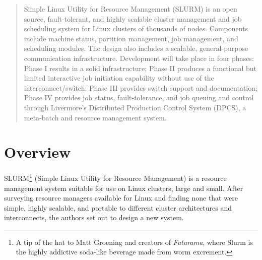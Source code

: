 
\newcommand{\srun}{{\tt srun}}
\newcommand{\scancel}{{\tt scancel}}
\newcommand{\squeue}{{\tt squeue}}
\newcommand{\scontrol}{{\tt scontrol}}
\newcommand{\slurmctld}{{\tt slurmctld}}
\newcommand{\slurmd}{{\tt slurmd}}


\maketitle

\begin{abstract}
Simple Linux Utility for Resource Management (SLURM) is an open source,
fault-tolerant, and highly scalable cluster management and job 
scheduling system for Linux clusters of 
thousands of nodes.  Components include machine status, partition
management, job management, and scheduling modules.  The design also 
includes a scalable, general-purpose communication infrastructure.
Development will take place in four phases:  Phase I results in a solid
infrastructure;  Phase II produces a functional but limited interactive 
job initiation capability without use of the interconnect/switch; 
Phase III provides switch support and documentation; Phase IV provides 
job status, fault-tolerance, and job queuing and control through  
Livermore's Distributed Production Control System (DPCS), a meta-batch and
resource management system.
\end{abstract}

\vspace{0.25in}


\newpage



\section{Overview}

SLURM\footnote{A tip of the hat to Matt Groening and creators of {\em Futurama},
where Slurm is the highly addictive soda-like beverage made from worm
excrement.} (Simple Linux Utility for Resource Management) 
is a resource management 
system suitable for use on Linux clusters, large and small.  After 
surveying\cite{Jette2002} resource managers available for Linux and finding 
none that were simple, highly scalable, and portable to different cluster 
architectures and interconnects, the authors set out to design a new system.

